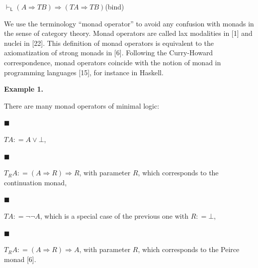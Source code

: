 \par  \quad  $\displaystyle\vdash_{\mathsf{L}}(A\mathbin{\Rightarrow}TB)\mathbin{\Rightarrow}(TA\mathbin{\Rightarrow}TB)$\quad  \quad  (bind)\quad  
  
We use the terminology “monad operator” to avoid any confusion with monads in the sense of category theory. Monad operators are called lax modalities in [1] and nuclei in [22]. This definition of monad operators is equivalent to the axiomatization of strong monads in [6]. Following the Curry-Howard correspondence, monad operators coincide with the notion of monad in programming languages [15], for instance in Haskell.\par
 
 
 
\par\medskip\noindent\textbf{Example 1.}\par
 
 
There are many monad operators of minimal logic:\par
  
\par\noindent  $\blacksquare$ 
 
$TA\mathrel{\mathop{:}}=A\mathbin{\vee}\bot$,\par
 
 
 
\par\noindent  $\blacksquare$ 
 
$T_{R}A\mathrel{\mathop{:}}=(A\mathbin{\Rightarrow}R)\mathbin{\Rightarrow}R$, with parameter $R$, which corresponds to the continuation monad,\par
 
 
 
\par\noindent  $\blacksquare$ 
 
$TA\mathrel{\mathop{:}}=\neg\neg A$, which is a special case of the previous one with $R\mathrel{\mathop{:}}=\bot$,\par
 
 
 
\par\noindent  $\blacksquare$ 
 
$T_{R}A\mathrel{\mathop{:}}=(A\mathbin{\Rightarrow}R)\mathbin{\Rightarrow}A$, with parameter $R$, which corresponds to the Peirce monad [6].\par
 
